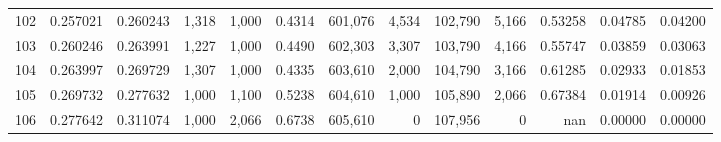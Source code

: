 \begin{tabular}{rrrrrrrrrrrrr}
102 &  0.257021 &  0.260243 &   1,318 &  1,000 &                                     0.4314 &  601,076 &    4,534 &  102,790 &    5,166 &  0.53258 &  0.04785 &  0.04200 \\
103 &  0.260246 &  0.263991 &   1,227 &  1,000 &                                     0.4490 &  602,303 &    3,307 &  103,790 &    4,166 &  0.55747 &  0.03859 &  0.03063 \\
104 &  0.263997 &  0.269729 &   1,307 &  1,000 &                                     0.4335 &  603,610 &    2,000 &  104,790 &    3,166 &  0.61285 &  0.02933 &  0.01853 \\
105 &  0.269732 &  0.277632 &   1,000 &  1,100 &                                     0.5238 &  604,610 &    1,000 &  105,890 &    2,066 &  0.67384 &  0.01914 &  0.00926 \\
106 &  0.277642 &  0.311074 &   1,000 &  2,066 &                                     0.6738 &  605,610 &        0 &  107,956 &        0 &      nan &  0.00000 &  0.00000 \\
\bottomrule
\end{tabular}

